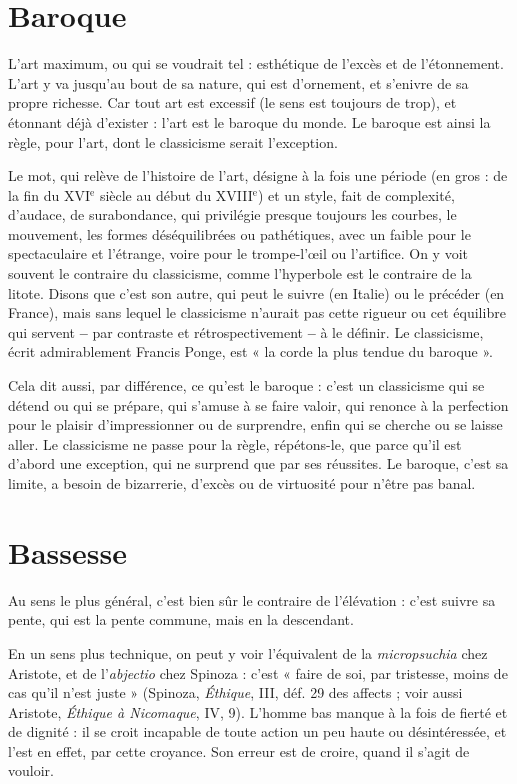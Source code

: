\section{Baroque}
L’art maximum, ou qui se voudrait tel : esthétique de l’excès et
de l’étonnement. L’art y va jusqu’au bout de sa nature, qui est
d'ornement, et s’enivre de sa propre richesse. Car tout art est excessif (le sens
est toujours de trop), et étonnant déjà d’exister : l’art est le baroque du monde.
Le baroque est ainsi la règle, pour l’art, dont le classicisme serait l'exception.

Le mot, qui relève de l’histoire de l’art, désigne à la fois une période (en gros :
de la fin du {\footnotesize XVI$^\text{e}$} siècle au début du {\footnotesize XVIII$^\text{e}$}) et un style, fait de complexité, d’audace,
de surabondance, qui privilégie presque toujours les courbes, le mouvement, les
formes déséquilibrées ou pathétiques, avec un faible pour le spectaculaire et
l'étrange, voire pour le trompe-l’œil ou l'artifice. On y voit souvent le contraire
du classicisme, comme l’hyperbole est le contraire de la litote. Disons que c’est
son autre, qui peut le suivre (en Italie) ou le précéder (en France), mais sans
lequel le classicisme n’aurait pas cette rigueur ou cet équilibre qui servent {\bf --} par
contraste et rétrospectivement {\bf --} à le définir. Le classicisme, écrit admirablement
Francis Ponge, est « la corde la plus tendue du baroque ».

Cela dit aussi, par différence, ce qu’est le baroque : c’est un classicisme qui
se détend ou qui se prépare, qui s’amuse à se faire valoir, qui renonce à la perfection
pour le plaisir d’impressionner ou de surprendre, enfin qui se cherche
ou se laisse aller. Le classicisme ne passe pour la règle, répétons-le, que parce
qu'il est d’abord une exception, qui ne surprend que par ses réussites. Le
baroque, c’est sa limite, a besoin de bizarrerie, d’excès ou de virtuosité pour
n'être pas banal.

\section{Bassesse}
Au sens le plus général, c’est bien sûr le contraire de l'élévation :
c’est suivre sa pente, qui est la pente commune, mais en la descendant.

En un sens plus technique, on peut y voir l’équivalent de la {\it micropsuchia}
chez Aristote, et de l’{\it abjectio} chez Spinoza : c’est « faire de soi, par tristesse,
moins de cas qu’il n’est juste » (Spinoza, {\it Éthique}, III, déf. 29 des affects ; voir
aussi Aristote, {\it Éthique à Nicomaque}, IV, 9). L'homme bas manque à la fois de
fierté et de dignité : il se croit incapable de toute action un peu haute ou désintéressée,
et l’est en effet, par cette croyance. Son erreur est de croire, quand il
s’agit de vouloir.

